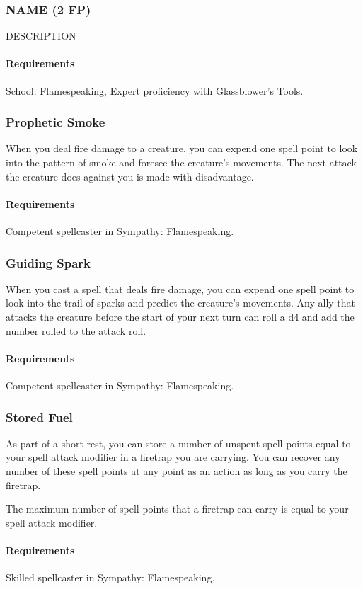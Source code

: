 \subsubsection{NAME (2 FP)} \label{feat::name}
    DESCRIPTION
    \paragraph{Requirements} School: Flamespeaking, Expert proficiency with Glassblower's Tools.

\subsubsection{Prophetic Smoke} \label{feat::propheticsmoke}
    When you deal fire damage to a creature, you can expend one spell point to look into the pattern of smoke and foresee the creature's movements.
    The next attack the creature does against you is made with disadvantage.
    \paragraph{Requirements} Competent spellcaster in Sympathy: Flamespeaking.
\subsubsection{Guiding Spark} \label{feat::guidingspark}
    When you cast a spell that deals fire damage, you can expend one spell point to look into the trail of sparks and predict the creature's movements.
    Any ally that attacks the creature before the start of your next turn can roll a d4 and add the number rolled to the attack roll.
    \paragraph{Requirements} Competent spellcaster in Sympathy: Flamespeaking.
\subsubsection{Stored Fuel} \label{feat::storedfuel}
    As part of a short rest, you can store a number of unspent spell points equal to your spell attack modifier in a firetrap you are carrying.
    You can recover any number of these spell points at any point as an action as long as you carry the firetrap.

    The maximum number of spell points that a firetrap can carry is equal to your spell attack modifier.
    \paragraph{Requirements} Skilled spellcaster in Sympathy: Flamespeaking.
